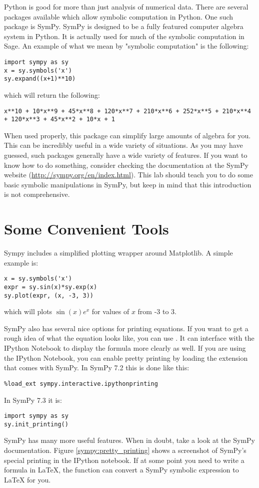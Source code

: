 \label{lab:SymPy}


Python is good for more than just analysis of numerical data.
There are several packages available which allow symbolic computation in Python.
One such package is SymPy.
SymPy is designed to be a fully featured computer algebra system in Python.
It is actually used for much of the symbolic computation in Sage.
An example of what we mean by "symbolic computation" is the following:
\begin{lstlisting}
import sympy as sy
x = sy.symbols('x')
sy.expand((x+1)**10)
\end{lstlisting}
which will return the following:
\begin{lstlisting}
x**10 + 10*x**9 + 45*x**8 + 120*x**7 + 210*x**6 + 252*x**5 + 210*x**4 + 120*x**3 + 45*x**2 + 10*x + 1
\end{lstlisting}
When used properly, this package can simplify large amounts of algebra for you.
This can be incredibly useful in a wide variety of situations.
As you may have guessed, such packages generally have a wide variety of features.
If you want to know how to do something, consider checking the documentation  at the SymPy website (\url{http://sympy.org/en/index.html}).
This lab should teach you to do some basic symbolic manipulations in SymPy, but keep in mind that this introduction is not comprehensive.

\section*{Some Convenient Tools}

Sympy includes a simplified plotting wrapper around Matplotlib.
A simple example is:
\begin{lstlisting}
x = sy.symbols('x')
expr = sy.sin(x)*sy.exp(x)
sy.plot(expr, (x, -3, 3))
\end{lstlisting}
which will plots $\sin\left(x\right) e^x$ for values of $x$ from -3 to 3.

SymPy also has several nice options for printing equations.
If you want to get a rough idea of what the equation looks like, you can use .
It can interface with the IPython Notebook to display the formula more clearly as well.
If you are using the IPython Notebook, you can enable pretty printing by loading the extension that comes with SymPy.
In SymPy 7.2 this is done like this:
\begin{lstlisting}
%load_ext sympy.interactive.ipythonprinting
\end{lstlisting}
In SymPy 7.3 it is:
\begin{lstlisting}
import sympy as sy
sy.init_printing()
\end{lstlisting}
SymPy has many more useful features.
When in doubt, take a look at the SymPy documentation.
Figure \ref{sympy:pretty_printing} shows a screenshot of SymPy's special printing in the IPython notebook.
If at some point you need to write a formula in \LaTeX, the function  can convert a SymPy symbolic expression to \LaTeX{} for you.

